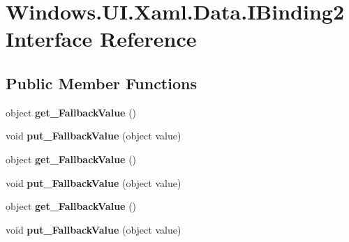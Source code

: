 \hypertarget{interface_windows_1_1_u_i_1_1_xaml_1_1_data_1_1_i_binding2}{}\section{Windows.\+U\+I.\+Xaml.\+Data.\+I\+Binding2 Interface Reference}
\label{interface_windows_1_1_u_i_1_1_xaml_1_1_data_1_1_i_binding2}
\subsection*{Public Member Functions}
\begin{DoxyCompactItemize}
\item 
\mbox{\label{interface_windows_1_1_u_i_1_1_xaml_1_1_data_1_1_i_binding2_a737ad88f941b133d93f199ad69775013}} 
object {\bfseries get\+\_\+\+Fallback\+Value} ()
\item 
\mbox{\label{interface_windows_1_1_u_i_1_1_xaml_1_1_data_1_1_i_binding2_ac552a7f9e03997146250b19bd1f8dbfc}} 
void {\bfseries put\+\_\+\+Fallback\+Value} (object value)
\item 
\mbox{\label{interface_windows_1_1_u_i_1_1_xaml_1_1_data_1_1_i_binding2_a737ad88f941b133d93f199ad69775013}} 
object {\bfseries get\+\_\+\+Fallback\+Value} ()
\item 
\mbox{\label{interface_windows_1_1_u_i_1_1_xaml_1_1_data_1_1_i_binding2_ac552a7f9e03997146250b19bd1f8dbfc}} 
void {\bfseries put\+\_\+\+Fallback\+Value} (object value)
\item 
\mbox{\label{interface_windows_1_1_u_i_1_1_xaml_1_1_data_1_1_i_binding2_a737ad88f941b133d93f199ad69775013}} 
object {\bfseries get\+\_\+\+Fallback\+Value} ()
\item 
\mbox{\label{interface_windows_1_1_u_i_1_1_xaml_1_1_data_1_1_i_binding2_ac552a7f9e03997146250b19bd1f8dbfc}} 
void {\bfseries put\+\_\+\+Fallback\+Value} (object value)

\end{DoxyCompactItemize}
